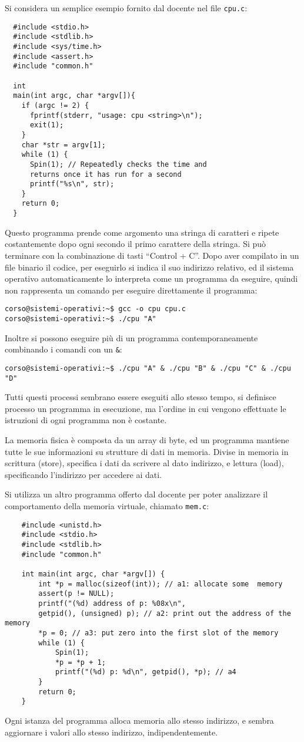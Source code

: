 \documentclass{article}
\numberwithin{equation}{subsection}
\begin{document}
Si considera un semplice esempio fornito dal docente nel file \verb|cpu.c|:
\begin{verbatim}
  #include <stdio.h>
  #include <stdlib.h>
  #include <sys/time.h>
  #include <assert.h>
  #include "common.h"

  int
  main(int argc, char *argv[]){
    if (argc != 2) {
      fprintf(stderr, "usage: cpu <string>\n");
      exit(1);
    }
    char *str = argv[1];
    while (1) {
      Spin(1); // Repeatedly checks the time and
      returns once it has run for a second
      printf("%s\n", str);
    }
    return 0;
  }
\end{verbatim}


Questo programma prende come argomento una stringa di caratteri e ripete costantemente dopo ogni secondo il primo carattere della stringa. Si può terminare con la 
combinazione di tasti ``Control + C''. Dopo aver compilato in un file binario il codice, per eseguirlo si indica il suo indirizzo relativo, ed il sistema operativo automaticamente lo interpreta come un 
programma da eseguire, quindi non rappresenta un comando per eseguire direttamente il programma:
\begin{verbatim}
corso@sistemi-operativi:~$ gcc -o cpu cpu.c 
corso@sistemi-operativi:~$ ./cpu "A"
\end{verbatim}

Inoltre si possono eseguire più di un programma contemporaneamente combinando i comandi con un \verb|&|:
\begin{verbatim}
corso@sistemi-operativi:~$ ./cpu "A" & ./cpu "B" & ./cpu "C" & ./cpu "D"
\end{verbatim}

Tutti questi processi sembrano essere eseguiti allo stesso tempo, si definisce processo un programma in esecuzione, ma l'ordine in cui vengono effettuate le 
istruzioni di ogni programma non è costante. 

La memoria fisica è composta da un array di byte, ed un programma mantiene tutte le sue informazioni su strutture di dati in memoria. Divise in memoria in scrittura 
(store), specifica i dati da scrivere al dato indirizzo, e lettura (load), specificando l'indirizzo per accedere ai dati. 

Si utilizza un altro programma offerto dal docente per poter analizzare il comportamento della memoria virtuale, chiamato \verb|mem.c|:
\begin{verbatim}
	#include <unistd.h>
	#include <stdio.h>
	#include <stdlib.h>
	#include "common.h"

	int main(int argc, char *argv[]) {
		int *p = malloc(sizeof(int)); // a1: allocate some 	memory
		assert(p != NULL);
		printf("(%d) address of p: %08x\n",
		getpid(), (unsigned) p); // a2: print out the address of the memory
		*p = 0; // a3: put zero into the first slot of the memory
		while (1) {
			Spin(1);
			*p = *p + 1;
			printf("(%d) p: %d\n", getpid(), *p); // a4
		}
		return 0;
	}
\end{verbatim}
Ogni istanza del programma alloca memoria allo stesso indirizzo, e sembra aggiornare i valori allo stesso indirizzo, indipendentemente. 
\end{document}
